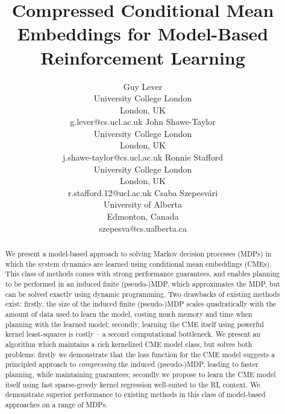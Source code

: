 \documentclass[letterpaper]{article}
\begin{document}
%
\title{Compressed Conditional Mean Embeddings for Model-Based Reinforcement Learning}
\author{Guy Lever \\ University College London \\ London, UK \\ g.lever@cs.ucl.ac.uk \And John Shawe-Taylor \\ University College London \\ London, UK \\ j.shawe-taylor@cs.ucl.ac.uk \And Ronnie Stafford \\ University College London \\ London, UK \\ r.stafford.12@ucl.ac.uk \And Csaba Szepesv\'{a}ri \\ University of Alberta \\ Edmonton, Canada \\ szepesva@cs.ualberta.ca  }
\maketitle

\begin{abstract} We present a model-based approach to solving Markov decision processes (MDPs) in which the system dynamics are learned using conditional mean embeddings (CMEs). This class of methods comes with strong performance guarantees, and enables planning to be performed in an induced finite (pseudo-)MDP, which approximates the MDP, but can be solved exactly using dynamic programming. Two drawbacks of existing methods exist: firstly, the size of the induced finite (pseudo-)MDP scales quadratically with the amount of data used to learn the model, costing much memory and time when planning with the learned model; secondly, learning the CME itself using powerful kernel least-squares is costly -- a second computational bottleneck. We present an algorithm which maintains a rich kernelized CME model class, but solves both problems: firstly we demonstrate that the loss function for the CME model suggests a principled approach to \emph{compressing} the induced (pseudo-)MDP, leading to faster planning, while maintaining guarantees; secondly we propose to learn the CME model itself using fast sparse-greedy kernel regression well-suited to the RL context. We demonstrate superior performance to existing methods in this class of model-based approaches on a range of MDPs.
\end{abstract}
\end{document}
